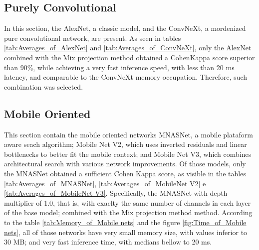 \pagebreak

\subsection{Purely Convolutional}







In this section, the AlexNet, a classic model, and the ConvNeXt, a mordenized pure convolutional network, are present. As seen in tables \ref{tab:Averages_of_AlexNet} and \ref{tab:Averages_of_ConvNeXt}, only the AlexNet combined with the \acrshort{Mix} projection method obtained a CohenKappa score superior than 90\%, while achieving a very fast inference speed, with less than 20 ms latency, and comparable to the ConvNeXt memory occupation. Therefore, such combination was selected.  

\pagebreak

\subsection{Mobile Oriented}







\pagebreak

This section contain the mobile oriented networks MNASNet, a mobile plataform aware seach algorithm; Mobile Net V2, which uses inverted residuals and linear bottlenecks to better fit the mobile context; and Mobile Net V3, which combines architectural search with various network improvements. Of those models, only the MNASNet obtained a sufficient Cohen Kappa score, as visible in the tables \ref{tab:Averages_of_MNASNet}, \ref{tab:Averages_of_MobileNet V2} e \ref{tab:Averages_of_MobileNet V3}. Specifically, the MNASNet with depth multiplier of 1.0, that is, with exaclty the same number of channels in each layer of the base model; combined with the \acrshort{Mix} projection method method. According to the table \ref{tab:Memory_of_Mobile nets} and the figure \ref{fig:Time_of_Mobile nets}, all of those networks have very small memory size, with values inferior to 30 MB; and very fast inference time, with medians bellow to 20 ms.  

